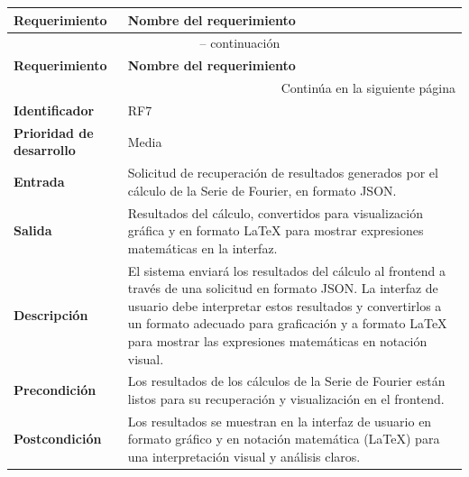 \begin{longtable}{|m{3.5cm}|m{9.5cm}|}
	\hline
	\rowcolor{black!75} \color{white}\textbf{Requerimiento} & \color{white}\textbf{Nombre del requerimiento} \\
	\hline
	\endfirsthead
	\multicolumn{2}{c}{{\tablename\ \thetable{} -- continuación}} \\
	\hline
	\rowcolor{black!75} \color{white}\textbf{Requerimiento} & \color{white}\textbf{Nombre del requerimiento} \\
	\hline
	\endhead
	\hline \multicolumn{2}{r}{{Continúa en la siguiente página}} \\
	\endfoot
	\hline
	\endlastfoot
	
	\textbf{Identificador} & RF7 \\
	\hline
	\textbf{Prioridad de desarrollo} & Media \\
	\hline
	\textbf{Entrada} & Solicitud de recuperación de resultados generados por el cálculo de la Serie de Fourier, en formato JSON. \\
	\hline
	\textbf{Salida} & Resultados del cálculo, convertidos para visualización gráfica y en formato LaTeX para mostrar expresiones matemáticas en la interfaz. \\
	\hline
	\textbf{Descripción} & El sistema enviará los resultados del cálculo al frontend a través de una solicitud en formato JSON. La interfaz de usuario debe interpretar estos resultados y convertirlos a un formato adecuado para graficación y a formato LaTeX para mostrar las expresiones matemáticas en notación visual. \\
	\hline
	\textbf{Precondición} & Los resultados de los cálculos de la Serie de Fourier están listos para su recuperación y visualización en el frontend. \\
	\hline
	\textbf{Postcondición} & Los resultados se muestran en la interfaz de usuario en formato gráfico y en notación matemática (LaTeX) para una interpretación visual y análisis claros. \\
	\hline
\end{longtable}
\caption{Requerimiento funcional No. 7} \label{tabla:RF7}
\vspace{0.5cm}

